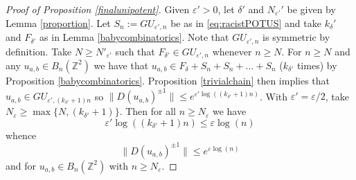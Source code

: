 \documentclass[10pt,reqno]{amsart}
\theoremstyle{Theorem}
\theoremstyle{definition}
\theoremstyle{remark}
\newcommand{\note}[1]{\marginpar{{\color{red}\footnotesize \begin{spacing}{1}#1\end{spacing}}}}
\renewcommand{\epsilon}{\varepsilon}
\newcommand{\Z}{\mathbb {Z}}
\newcommand{\e}{\epsilon}
\begin{document}
%
%
%
\begin{proof}[Proof of Proposition \ref{finalunipotent}] Given $\epsilon'>0$,  let  $\delta'$ and $ N_{\e'}'$ be given by Lemma \ref{proportion}.  Let $S_n := GU_{\e',n}$ be as in \eqref{eq:racistPOTUS}  and take $k_\delta'$ and $F_{\delta'}$ as in  Lemma \ref{babycombinatorics}.  Note that $GU_{\e',n}$  is symmetric by definition.
Take $N\ge N'_{\e'}$  such  that $F_{\delta'} \in GU_{\e',n}$ whenever $n \geq N $. For $n\ge N$ and any $u_{a,b} \in B_n(\Z^2)$ we have that $u_{a,b} \in F_\delta + S_n + S_n+ ... + S_n $ ($k_{\delta'}$ times) by Proposition \ref{babycombinatorics}. Proposition \ref{trivialchain} then implies   that $u_{a,b} \in GU_{ \e', (k_{\delta'} +1)n}$ so $\|D(u_{a,b})^{\pm1}\| \leq e^{ \e' \log( (k_{\delta'} +1)n ) }$.  With  $\epsilon '= \epsilon /2$, take $N_\epsilon\ge \max\{N,(k_{\delta'} +1)\}. $ Then for all $n\ge N_\epsilon$ we have $$ \e' \log( (k_{\delta'} +1)n) \le  \e \log(n)$$
whence
$$\|D(u_{a,b})^{\pm1}\|\le e^{\epsilon \log(n)}$$
and for $u_{a,b} \in B_n(\Z^2)$ with $n\ge N_\epsilon$.
\end{proof}
\end{document}
